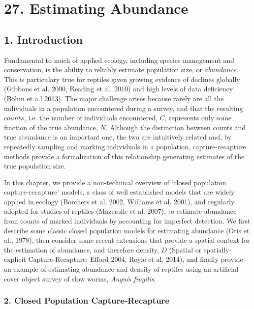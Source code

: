 \documentclass{book}
\begin{document}
\chapter*{27. Estimating Abundance\\
          }

\section*{1. Introduction}

Fundamental to much of applied ecology, including species management
and conservation, is the ability to reliably estimate population size,
or $abundance$. This is particulary true for reptiles given growing
evidence of declines globally (Gibbons et al. 2000, Reading et
al. 2010) and high levels of data deficiency (B{\"o}hm et a.l 2013). The 
major challenge arises because rarely are all the individuals in a 
population encountered during a survey, and that the
resulting $counts$, i.e. the number of individuals encountered, $C$,
represents only some fraction of the true abundance, $N$. Although the
distinction between counts and true abundance is an important one, the
two are intuitively related and, by repeatedly sampling and marking
individuals in a population, capture-recapture methods provide a
formalization of this relationship generating estimates of the true
population size.

In this chapter, we provide a non-technical overview of `closed
population capture-recapture' models, a class of well established
models that are widely applied in ecology (Borchers et al. 2002,
Williams et al. 2001), and regularly adopted for studies of reptiles
(Mazerolle et al. 2007), to estimate abundance from counts of marked
individuals by accounting for imperfect detection. We first describe
some classic closed population models for estimating abundance (Otis
et al., 1978), then consider some recent extensions that provide a
spatial context for the estimation of abundance, and therefore
density, $D$ (Spatial or spatially-explicit Capture-Recapture: Efford
2004, Royle et al. 2014), and finally provide an example of estimating
abundance and density of reptiles using an artificial cover object
survey of slow worms, \textit{Anguis fragilis}.

\subsection*{2. Closed Population Capture-Recapture}
\end{document}
